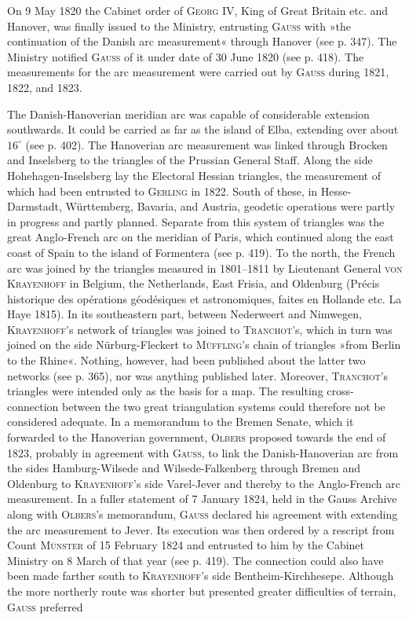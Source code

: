 \par\noindent\hspace*{\parindent}On 9 May 1820 the Cabinet order of \textsc{Georg} IV, King of Great Britain etc. and Hanover, was finally issued to the Ministry, entrusting \textsc{Gauss} with »the continuation of the Danish arc measurement« through Hanover (see p. 347). The Ministry notified \textsc{Gauss} of it under date of 30 June 1820 (see p. 418). The measurements for the arc measurement were carried out by \textsc{Gauss} during 1821, 1822, and 1823.

\par\noindent\hspace*{\parindent}The Danish-Hanoverian meridian arc was capable of considerable extension southwards. It could be carried as far as the island of Elba, extending over about $16^\circ$ (see p. 402). The Hanoverian arc measurement was linked through Brocken and Inselsberg to the triangles of the Prussian General Staff. Along the side Hohehagen-Inselsberg lay the Electoral Hessian triangles, the measurement of which had been entrusted to \textsc{Gerling} in 1822. South of these, in Hesse-Darmstadt, Württemberg, Bavaria, and Austria, geodetic operations were partly in progress and partly planned. Separate from this system of triangles was the great Anglo-French arc on the meridian of Paris, which continued along the east coast of Spain to the island of Formentera (see p. 419). To the north, the French arc was joined by the triangles measured in 1801--1811 by Lieutenant General \textsc{von Krayenhoff} in Belgium, the Netherlands, East Frisia, and Oldenburg (Précis historique des opérations géodésiques et astronomiques, faites en Hollande etc. La Haye 1815). In its southeastern part, between Nederweert and Nimwegen, \textsc{Krayenhoff}'s network of triangles was joined to \textsc{Tranchot}'s, which in turn was joined on the side Nürburg-Fleckert to \textsc{Müffling}'s chain of triangles »from Berlin to the Rhine«. Nothing, however, had been published about the latter two networks (see p. 365), nor was anything published later. Moreover, \textsc{Tranchot}'s triangles were intended only as the basis for a map. The resulting cross-connection between the two great triangulation systems could therefore not be considered adequate. In a memorandum to the Bremen Senate, which it forwarded to the Hanoverian government, \textsc{Olbers} proposed towards the end of 1823, probably in agreement with \textsc{Gauss}, to link the Danish-Hanoverian arc from the sides Hamburg-Wilsede and Wilsede-Falkenberg through Bremen and Oldenburg to \textsc{Krayenhoff}'s side Varel-Jever and thereby to the Anglo-French arc measurement. In a fuller statement of 7 January 1824, held in the Gauss Archive along with \textsc{Olbers}'s memorandum, \textsc{Gauss} declared his agreement with extending the arc measurement to Jever. Its execution was then ordered by a rescript from Count \textsc{Münster} of 15 February 1824 and entrusted to him by the Cabinet Ministry on 8 March of that year (see p. 419). The connection could also have been made farther south to \textsc{Krayenhoff}'s side Bentheim-Kirchhesepe. Although the more northerly route was shorter but presented greater difficulties of terrain, \textsc{Gauss} preferred 